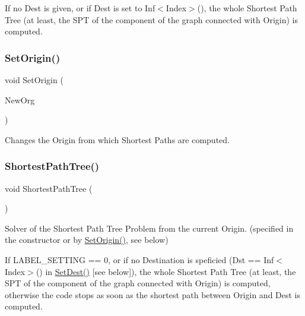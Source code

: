 If no Dest is given, or if Dest is set to Inf$<$\+Index$>$(), the whole Shortest Path Tree (at least, the S\+PT of the component of the graph connected with Origin) is computed. \mbox{\label{class_s_p_tree_a90071ff5bdcd7e73fe156180fe7ffcee}} 
\subsubsection{\texorpdfstring{Set\+Origin()}{SetOrigin()}}
{\footnotesize\ttfamily void Set\+Origin (\begin{DoxyParamCaption}\item[{\mbox{\hyperlink{class_m_c_f_class_a76aaabb20535c51a2752b93f6c38fe54}{c\+Index}}}]{New\+Org }\end{DoxyParamCaption})\hspace{0.3cm}{\ttfamily [inline]}}

Changes the Origin from which Shortest Paths are computed. \mbox{\label{class_s_p_tree_a76e377a946e5a08dba5172117eaf68a8}} 
\subsubsection{\texorpdfstring{Shortest\+Path\+Tree()}{ShortestPathTree()}}
{\footnotesize\ttfamily void Shortest\+Path\+Tree (\begin{DoxyParamCaption}\item[{void}]{ }\end{DoxyParamCaption})}

Solver of the Shortest Path Tree Problem from the current Origin. (specified in the constructor or by \mbox{\hyperlink{class_s_p_tree_a90071ff5bdcd7e73fe156180fe7ffcee}{Set\+Origin()}}, see below)

If L\+A\+B\+E\+L\+\_\+\+S\+E\+T\+T\+I\+NG == 0, or if no Destination is speficied (Dst == Inf$<$\+Index$>$() in \mbox{\hyperlink{class_s_p_tree_a1fad8461dbf04f0981f698a4d1b9fbd9}{Set\+Dest()}} \mbox{[}see below\mbox{]}), the whole Shortest Path Tree (at least, the S\+PT of the component of the graph connected with Origin) is computed, otherwise the code stops as soon as the shortest path between Origin and Dest is computed.

